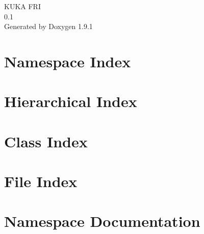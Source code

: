 \let\mypdfximage\pdfximage\def\pdfximage{\immediate\mypdfximage}\documentclass[twoside]{book}
\newcommand{\+}{\discretionary{\mbox{\scriptsize$\hookleftarrow$}}{}{}}
\newcommand{\clearemptydoublepage}{%
  \newpage{\pagestyle{empty}\cleardoublepage}%
}
\begin{document}
\raggedbottom

\hypersetup{pageanchor=false,
             bookmarksnumbered=true,
             pdfencoding=unicode
            }
\begin{titlepage}
\vspace*{7cm}
\begin{center}%
{\Large KUKA FRI \\[1ex]\large 0.\+1 }\\
\vspace*{1cm}
{\large Generated by Doxygen 1.9.1}\\
\end{center}
\end{titlepage}
\clearemptydoublepage
{}
\tableofcontents
\clearemptydoublepage
{}
\hypersetup{pageanchor=true}

\chapter{Namespace Index}

\chapter{Hierarchical Index}

\chapter{Class Index}

\chapter{File Index}

\chapter{Namespace Documentation}


\end{document}
